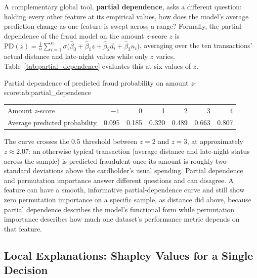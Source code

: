 \documentclass[../ai_in_finance]{subfiles}
\begin{document}
A complementary global tool, \textbf{partial dependence}, asks a different question: holding every other feature at its empirical values, how does the model's average prediction change as one feature is swept across a range? Formally, the partial dependence of the fraud model on the amount $z$-score $z$ is $\text{PD}(z) = \frac{1}{n}\sum_{i=1}^n \sigma\big(\hat\beta_0 + \hat\beta_1 z + \hat\beta_2 d_i + \hat\beta_3 n_i\big)$, averaging over the ten transactions' actual distance and late-night values while only $z$ varies. Table~\ref{tab:partial_dependence} evaluates this at six values of $z$.

\begin{booktable}[htbp]{Partial dependence of predicted fraud probability on amount $z$-score}{tab:partial_dependence}
\begin{tabular}{lrrrrrr}
\toprule
Amount $z$-score & $-1$ & 0 & 1 & 2 & 3 & 4 \\
Average predicted probability & 0.095 & 0.185 & 0.320 & 0.489 & 0.663 & 0.807 \\
\bottomrule
\end{tabular}
\end{booktable}

The curve crosses the 0.5 threshold between $z=2$ and $z=3$, at approximately $z \approx 2.07$: an otherwise typical transaction (average distance and late-night status across the sample) is predicted fraudulent once its amount is roughly two standard deviations above the cardholder's usual spending. Partial dependence and permutation importance answer different questions and can disagree. A feature can have a smooth, informative partial-dependence curve and still show zero permutation importance on a specific sample, as distance did above, because partial dependence describes the model's functional form while permutation importance describes how much one dataset's performance metric depends on that feature.

\subsection{Local Explanations: Shapley Values for a Single Decision}
\label{sec:shapley-explain}
\end{document}
